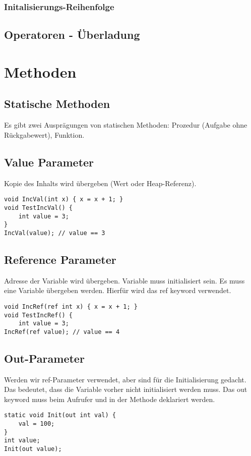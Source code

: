 \subsubsection{Initalisierungs-Reihenfolge}

\subsection{Operatoren - Überladung}

\pagebreak


\section{Methoden}
\subsection{Statische Methoden}
Es gibt zwei Ausprägungen von statischen Methoden: Prozedur (Aufgabe ohne Rückgabewert), Funktion. 

\subsection{Value Parameter}
Kopie des Inhalts wird übergeben (Wert oder Heap-Referenz).
\begin{lstlisting}
void IncVal(int x) { x = x + 1; } 
void TestIncVal() {
	int value = 3;
}
IncVal(value); // value == 3 
\end{lstlisting}

\subsection{Reference Parameter}
Adresse der Variable wird übergeben. Variable muss initialisiert sein. Es muss eine Variable übergeben werden. Hierfür wird das ref keyword verwendet.
\begin{lstlisting}
void IncRef(ref int x) { x = x + 1; } 
void TestIncRef() {
	int value = 3;
IncRef(ref value); // value == 4
\end{lstlisting}

\subsection{Out-Parameter}
Werden wir ref-Parameter verwendet, aber sind für die Initialisierung gedacht. Das bedeutet, dass die Variable vorher nicht initialisiert werden muss. Das out keyword muss beim Aufrufer und in der Methode deklariert werden.
\begin{lstlisting}
static void Init(out int val) {
	val = 100;
}
int value;
Init(out value);	
\end{lstlisting}

